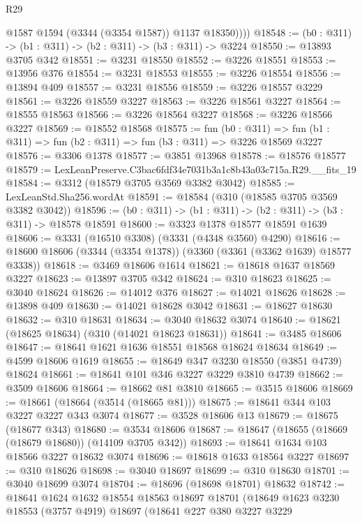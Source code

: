 \begin{lexlean}{R29}
\begin{coremodule}
            @1587
            @1594
            (@3344 (@3354 @1587))
            @1137
            @18350))))
@18548 := (b0 : @311) -> (b1 : @311) -> (b2 : @311) -> (b3 : @311) -> @3224
@18550 := @13893 @3705 @342
@18551 := @3231 @18550
@18552 := @3226 @18551
@18553 := @13956 @376
@18554 := @3231 @18553
@18555 := @3226 @18554
@18556 := @13894 @409
@18557 := @3231 @18556
@18559 := @3226 @18557 @3229
@18561 := @3226 @18559 @3227
@18563 := @3226 @18561 @3227
@18564 := @18555 @18563
@18566 := @3226 @18564 @3227
@18568 := @3226 @18566 @3227
@18569 := @18552 @18568
@18575 := fun (b0 : @311) =>
  fun (b1 : @311) => fun (b2 : @311) => fun (b3 : @311) => @3226 @18569 @3227
@18576 := @3306 @1378
@18577 := @3851 @13968
@18578 := @18576 @18577
@18579 := LexLeanPreserve.C3bac6fdf34e7031b3a1c8b43a03c715a.R29.__fits_19
@18584 := @3312 (@18579 @3705 @3569 @3382 @3042)
@18585 := LexLeanStd.Sha256.wordAt
@18591 := @18584 (@310 (@18585 @3705 @3569 @3382 @3042))
@18596 := (b0 : @311) -> (b1 : @311) -> (b2 : @311) -> (b3 : @311) -> @18578 @18591
@18600 := @3323 @1378 @18577 @18591 @1639
@18606 := @3331 (@16510 @3308) (@3331 (@4348 @3560) @4290)
@18616 := @18600 @18606 (@3344 (@3354 @1378)) (@3360 (@3361 (@3362 @1639) @18577 @3338))
@18618 := @3469 @18606 @1614
@18621 := @18618 @1637 @18569 @3227
@18623 := @13897 @3705 @342
@18624 := @310 @18623
@18625 := @3040 @18624
@18626 := @14012 @376
@18627 := @14021 @18626
@18628 := @13898 @409
@18630 := @14021 @18628 @3042
@18631 := @18627 @18630
@18632 := @310 @18631
@18634 := @3040 @18632 @3074
@18640 := @18621 (@18625 @18634) (@310 (@14021 @18623 @18631))
@18641 := @3485 @18606
@18647 := @18641 @1621 @1636 @18551 @18568 @18624 @18634
@18649 := @4599 @18606 @1619
@18655 := @18649 @347 @3230 @18550 (@3851 @4739) @18624
@18661 := @18641 @101 @346 @3227 @3229 @3810 @4739
@18662 := @3509 @18606
@18664 := @18662 @81 @3810
@18665 := @3515 @18606
@18669 := @18661 (@18664 (@3514 (@18665 @81)))
@18675 := @18641 @344 @103 @3227 @3227 @343 @3074
@18677 := @3528 @18606 @13
@18679 := @18675 (@18677 @343)
@18680 := @3534 @18606
@18687 := @18647 (@18655 (@18669 (@18679 @18680)) (@14109 @3705 @342))
@18693 := @18641 @1634 @103 @18566 @3227 @18632 @3074
@18696 := @18618 @1633 @18564 @3227
@18697 := @310 @18626
@18698 := @3040 @18697
@18699 := @310 @18630
@18701 := @3040 @18699 @3074
@18704 := @18696 (@18698 @18701) @18632
@18742 := @18641
    @1624
    @1632
    @18554
    @18563
    @18697
    @18701
    (@18649
      @1623
      @3230
      @18553
      (@3757 @4919)
      @18697
      (@18641
        @227
        @380
        @3227
        @3229

\end{coremodule}
\end{lexlean}
